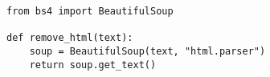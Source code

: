 \documentclass{article}
\begin{document}
\begin{verbatim}
from bs4 import BeautifulSoup

def remove_html(text):
    soup = BeautifulSoup(text, "html.parser")
    return soup.get_text()
\end{verbatim}
\end{document}
